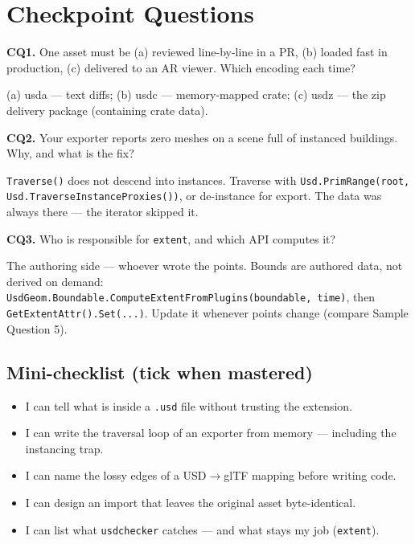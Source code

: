 \section*{Checkpoint Questions}

\noindent\textbf{CQ1.} One asset must be (a) reviewed line-by-line in a PR,
(b) loaded fast in production, (c) delivered to an AR viewer. Which encoding
each time?
\begin{DrillSolution}
(a) usda --- text diffs; (b) usdc --- memory-mapped crate; (c) usdz --- the
zip delivery package (containing crate data).
\end{DrillSolution}

\noindent\textbf{CQ2.} Your exporter reports zero meshes on a scene full of
instanced buildings. Why, and what is the fix?
\begin{DrillSolution}
\texttt{Traverse()} does not descend into instances. Traverse with
\texttt{Usd.PrimRange(root, Usd.TraverseInstanceProxies())}, or de-instance
for export. The data was always there --- the iterator skipped it.
\end{DrillSolution}

\noindent\textbf{CQ3.} Who is responsible for \texttt{extent}, and which API
computes it?
\begin{DrillSolution}
The authoring side --- whoever wrote the points. Bounds are authored data,
not derived on demand:
\texttt{UsdGeom.Boundable.ComputeExtentFromPlugins(boundable, time)}, then
\texttt{GetExtentAttr().Set(...)}. Update it whenever points change (compare
Sample Question 5).
\end{DrillSolution}

\subsection*{Mini-checklist (tick when mastered)}
\begin{itemize}[leftmargin=*]
  \item[$\square$] I can tell what is inside a \texttt{.usd} file without trusting the extension.
  \item[$\square$] I can write the traversal loop of an exporter from memory --- including the instancing trap.
  \item[$\square$] I can name the lossy edges of a USD$\rightarrow$glTF mapping before writing code.
  \item[$\square$] I can design an import that leaves the original asset byte-identical.
  \item[$\square$] I can list what \texttt{usdchecker} catches --- and what stays my job (\texttt{extent}).
\end{itemize}
